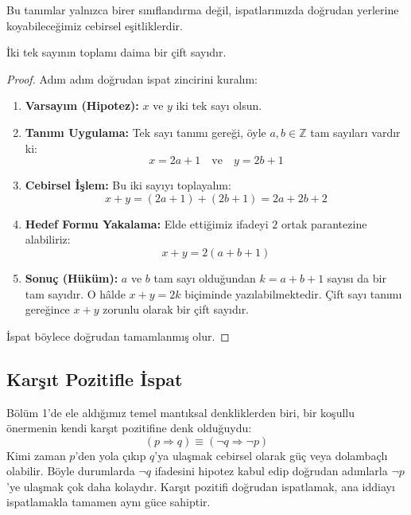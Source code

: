 Bu tanımlar yalnızca birer sınıflandırma değil, ispatlarımızda doğrudan yerlerine koyabileceğimiz cebirsel eşitliklerdir.

\begin{theorem}
İki tek sayının toplamı daima bir çift sayıdır.
\end{theorem}
\begin{proof}
Adım adım doğrudan ispat zincirini kuralım:
\begin{enumerate}
  \item \textbf{Varsayım (Hipotez):} $x$ ve $y$ iki tek sayı olsun.
  \item \textbf{Tanımı Uygulama:} Tek sayı tanımı gereği, öyle $a, b \in \mathbb{Z}$ tam sayıları vardır ki:
  \[ x = 2a + 1 \quad \text{ve} \quad y = 2b + 1 \]
  \item \textbf{Cebirsel İşlem:} Bu iki sayıyı toplayalım:
  \[ x + y = (2a + 1) + (2b + 1) = 2a + 2b + 2 \]
  \item \textbf{Hedef Formu Yakalama:} Elde ettiğimiz ifadeyi $2$ ortak parantezine alabiliriz:
  \[ x + y = 2(a + b + 1) \]
  \item \textbf{Sonuç (Hüküm):} $a$ ve $b$ tam sayı olduğundan $k = a + b + 1$ sayısı da bir tam sayıdır. O hâlde $x + y = 2k$ biçiminde yazılabilmektedir. Çift sayı tanımı gereğince $x + y$ zorunlu olarak bir çift sayıdır.
\end{enumerate}
İspat böylece doğrudan tamamlanmış olur.
\end{proof}

\subsection{Karşıt Pozitifle İspat}

Bölüm 1'de ele aldığımız temel mantıksal denkliklerden biri, bir koşullu önermenin kendi karşıt pozitifine denk olduğuydu:
\[ (p \Rightarrow q) \equiv (\neg q \Rightarrow \neg p) \]
Kimi zaman $p$'den yola çıkıp $q$'ya ulaşmak cebirsel olarak güç veya dolambaçlı olabilir. Böyle durumlarda $\neg q$ ifadesini hipotez kabul edip doğrudan adımlarla $\neg p$'ye ulaşmak çok daha kolaydır. Karşıt pozitifi doğrudan ispatlamak, ana iddiayı ispatlamakla tamamen aynı güce sahiptir.

